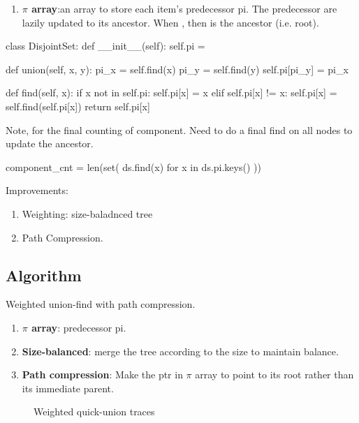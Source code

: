 \begin{enumerate}
\item \textbf{$\pi$ array}:an array to store each item's predecessor pi. The predecessor are lazily updated to its ancestor. When , then  is the ancestor (i.e. root).
\end{enumerate}
\begin{python}
class DisjointSet:
    def __init__(self):
        self.pi = {}

    def union(self, x, y):
        pi_x = self.find(x)
        pi_y = self.find(y)
        self.pi[pi_y] = pi_x

    def find(self, x):
        if x not in self.pi:
            self.pi[x] = x
        elif self.pi[x] != x:
            self.pi[x] = self.find(self.pi[x])
        return self.pi[x]
\end{python}

Note, for the final counting of component. Need to do a final find on all nodes to
update the ancestor.
\begin{python}
component_cnt = len(set(
    ds.find(x)
    for x in ds.pi.keys()
))
\end{python}

Improvements:
\begin{enumerate}
\item Weighting: size-baladnced tree
\item Path Compression.
\end{enumerate}
\subsection{Algorithm}
Weighted union-find with path compression.\\
\begin{enumerate}
\item \textbf{$\pi$ array}: predecessor pi.
\item \textbf{Size-balanced}: merge the tree according to the size to maintain balance.
\item \textbf{Path compression}: Make the ptr in $\pi$ array to point to its root rather than its immediate parent.
\end{enumerate}
\begin{figure}[]
\centering
\subfloat{\texttt{[image: uf]}}
\caption{Weighted quick-union traces}
\label{fig:union_find}
\end{figure}


